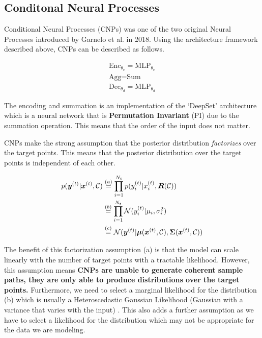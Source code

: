 \documentclass[main.tex]{subfiles}
\begin{document}
\subsection{Conditonal Neural Processes}

Conditional Neural Processes (CNPs) \cite{garnelo2018conditional} was one of the two original Neural Processes introduced by Garnelo et al. in 2018. Using the architecture framework described above, CNPs can be described as follows.

\begin{align*}
    \text{Enc}_{\theta_e} = \text{MLP}_{\theta_e} \\
    \text{Agg} = \text{Sum} \\
    \text{Dec}_{\theta_d}  = \text{MLP}_{\theta_d} 
\end{align*}

The encoding and summation is an implementation of the `DeepSet' architecture \cite{zaheer2018deep} which is a neural network that is \textbf{Permutation Invariant} (PI) due to the summation operation. This means that the order of the input does not matter. 


CNPs make the strong assumption that the posterior distribution \emph{factorizes} over the target points. This means that the posterior distribution over the target points is independent of each other. 

\begin{align}
    p(\bm{y}^{(t)} | \bm{x}^{(t)}, \mathcal{C}) &\stackrel{(a)}{=} \prod_{i=1}^{N_t} p({y}_i^{(t)} | {x}_i^{(t)}, \bm{R}(\mathcal{C})) \\ &\stackrel{(b)}{=}
    \prod_{i=1}^{N_t} \mathcal{N}({y}_i^{(t)} | \mu_i, \sigma_i^2) \\&\stackrel{(c)}{=} \mathcal{N}(\bm{y}^{(t)} | \bm{\mu}(\bm{x}^{(t)}, \mathcal{C}), \bm{\Sigma}(\bm{x}^{(t)}, \mathcal{C}))
\end{align}

The benefit of this factorization assumption (a) is that the model can scale linearly with the number of target points with a tractable likelihood. However, this assumption means
\textbf{CNPs are unable to generate coherent sample paths, they are only able to produce distributions over the target points.} Furthermore, we need to select a marginal likelihood for the distribution (b) which is usually a Heteroscedastic Gaussian Likelihood (Gaussian with a variance that varies with the input) \cite{garnelo2018conditional}. This also adds a further assumption as we have to select a likelihood for the distribution which may not be appropriate for the data we are modeling.
\end{document}
